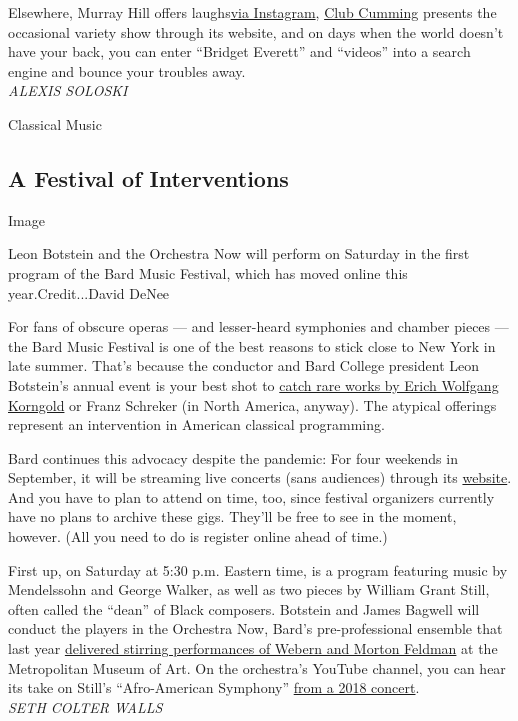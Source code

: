 Elsewhere, Murray Hill offers
laughs\href{https://www.instagram.com/p/CEIoksMFDbc/}{via Instagram},
\href{https://clubcummingnyc.com/}{Club Cumming} presents the occasional
variety show through its website, and on days when the world doesn't
have your back, you can enter ``Bridget Everett'' and ``videos'' into a
search engine and bounce your troubles away.\\
\emph{ALEXIS SOLOSKI}

Classical Music

\hypertarget{a-festival-of-interventions}{%
\subsection{A Festival of
Interventions}\label{a-festival-of-interventions}}

Image

Leon Botstein and the Orchestra Now will perform on Saturday in the
first program of the Bard Music Festival, which has moved online this
year.Credit...David DeNee

For fans of obscure operas --- and lesser-heard symphonies and chamber
pieces --- the Bard Music Festival is one of the best reasons to stick
close to New York in late summer. That's because the conductor and Bard
College president Leon Botstein's annual event is your best shot to
\href{https://www.nytimes3xbfgragh.onion/2019/07/29/arts/music/korngold-bard-music-festival.html}{catch
rare works by Erich Wolfgang Korngold} or Franz Schreker (in North
America, anyway). The atypical offerings represent an intervention in
American classical programming.

Bard continues this advocacy despite the pandemic: For four weekends in
September, it will be streaming live concerts (sans audiences) through
its \href{https://fishercenter.bard.edu/bmf/}{website}. And you have to
plan to attend on time, too, since festival organizers currently have no
plans to archive these gigs. They'll be free to see in the moment,
however. (All you need to do is register online ahead of time.)

First up, on Saturday at 5:30 p.m. Eastern time, is a program featuring
music by Mendelssohn and George Walker, as well as two pieces by William
Grant Still, often called the ``dean'' of Black composers. Botstein and
James Bagwell will conduct the players in the Orchestra Now, Bard's
pre-professional ensemble that last year
\href{https://www.nytimes3xbfgragh.onion/2019/05/25/arts/music/classical-music-youtube.html}{delivered
stirring performances of Webern and Morton Feldman} at the Metropolitan
Museum of Art. On the orchestra's YouTube channel, you can hear its take
on Still's ``Afro-American Symphony''
\href{https://www.youtube.com/watch?v=9S-g-qYnqQQ}{from a 2018
concert}.\\
\emph{SETH COLTER WALLS}

